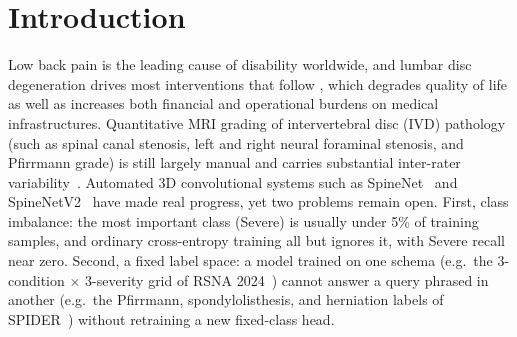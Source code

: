 \documentclass[runningheads]{llncs}
\begin{document}
\section{Introduction}\label{sec1}

Low back pain is the leading cause of disability worldwide, and lumbar disc degeneration drives most interventions that follow \cite{GBD2021LowBackPain}, which degrades quality of life as well as increases both financial and operational burdens on medical infrastructures. Quantitative MRI grading of intervertebral disc (IVD) pathology (such as spinal canal stenosis, left and right neural foraminal stenosis, and Pfirrmann grade) is still largely manual and carries substantial inter-rater variability~\cite{nigru2024}. Automated 3D convolutional systems such as SpineNet~\cite{jamaludin2017} and SpineNetV2~\cite{windsor2022} have made real progress, yet two problems remain open. First, class imbalance: the most important class (Severe) is usually under 5\% of training samples, and ordinary cross-entropy training all but ignores it, with Severe recall near zero. Second, a fixed label space: a model trained on one schema (e.g.\ the 3-condition $\times$ 3-severity grid of RSNA 2024~\cite{kaggle2024}) cannot answer a query phrased in another (e.g.\ the Pfirrmann, spondylolisthesis, and herniation labels of SPIDER~\cite{vandergraaf2024spider}) without retraining a new fixed-class head.
\end{document}
